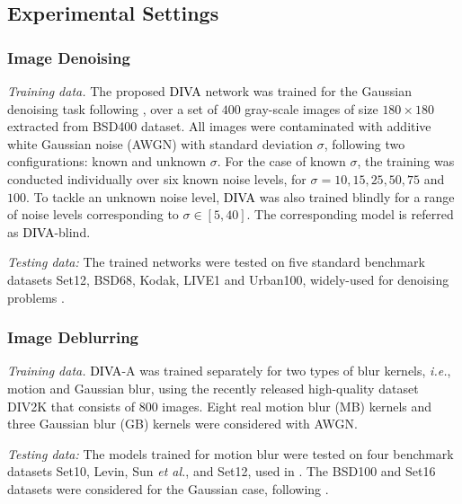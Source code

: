 \documentclass[10pt,journal,compsoc]{IEEEtran}
\newcommand{\dk}{\textcolor{black}}
\begin{document}
\subsection{Experimental Settings}
\label{sec:exp_setting}

\subsubsection{Image Denoising}
\textit{Training data.}
The proposed \dk{DIVA} network was trained for the Gaussian denoising task following \cite{Chen2017trainable, Zhang2017beyond, Zhang2018FFDNet}, over a set of $400$ gray-scale images of size $180 \times 180$ extracted from BSD400 dataset. All images were contaminated with additive white Gaussian noise (AWGN) with standard deviation $\sigma$, following two configurations: known and unknown $\sigma$. For the case of known $\sigma$, the training was conducted individually over six known noise levels, for $\sigma = 10, 15, 25, 50, 75$ and $100$. To tackle an unknown noise level, \dk{DIVA} was also trained blindly for a range of noise levels corresponding to $\sigma \in [5,40]$. The corresponding model is referred as \dk{DIVA}-blind.
 
\textit{Testing data:}
The trained networks were tested on five standard benchmark datasets Set12, BSD68, Kodak, LIVE1 and Urban100,
widely-used for denoising problems \cite{Zhang2017beyond, Zhang2018FFDNet}.

\subsubsection{Image Deblurring}
\textit{Training data.}
\dk{DIVA}-A was trained separately for two types of blur kernels, \textit{i.e.}, motion and Gaussian blur, using the recently released high-quality dataset DIV2K \cite{agustsson2017ntire} that consists of 800 images. Eight real motion blur (MB) kernels \cite{Levin2011efficient, Kong2022deep} and three Gaussian blur (GB) kernels \cite{Wang2018training} were considered with AWGN. %

\textit{Testing data:}
The models trained for motion blur were tested on four benchmark datasets Set10, Levin, Sun \textit{et al.}, and Set12, used in \cite{Kong2022deep, Nan2020variational}. The BSD100 and Set16 datasets were considered for the Gaussian case, following \cite{Wang2018training}.
\end{document}
